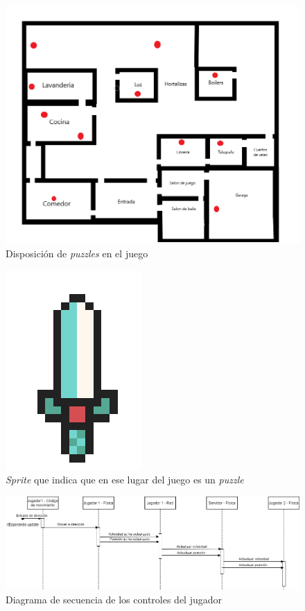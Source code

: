 \begin{figure}[H]
    \centering
    \includegraphics[width=0.5\linewidth]{images/MapaJuegoConItems.png}
    \caption{Disposición de \textit{puzzles} en el juego}
    \label{fig:items_on_map}
\end{figure}

\begin{figure}[H]
    \centering
    \includegraphics[scale=0.5]{images/espada_sprite.png}
    \caption{\textit{Sprite} que indica que en ese lugar del juego es un \textit{puzzle}}
    \label{fig:puzzle_location}
\end{figure}

\begin{figure}[H]
    \centering
    \includegraphics[width=1\linewidth]{images/diagrama_secuencia_movimientos.png}
    \caption{Diagrama de secuencia de los controles del jugador}
    \label{fig:diagrama_sec_movimiento}
\end{figure}

